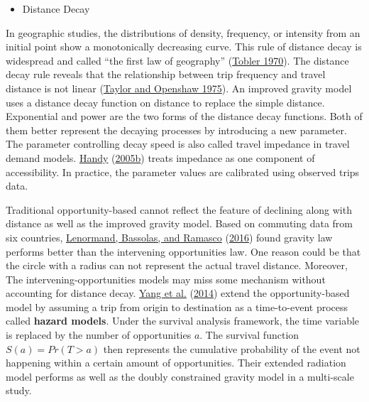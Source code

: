 \documentclass[
  12pt,
]{article}
\providecommand{\tightlist}{%
  \setlength{\itemsep}{0pt}\setlength{\parskip}{0pt}}
\begin{document}
\begin{itemize}
\tightlist
\item
  Distance Decay
\end{itemize}

In geographic studies, the distributions of density, frequency, or intensity from an initial point show a monotonically decreasing curve. This rule of distance decay is widespread and called ``the first law of geography'' (\protect\hyperlink{ref-toblerComputerMovieSimulating1970}{Tobler 1970}). The distance decay rule reveals that the relationship between trip frequency and travel distance is not linear (\protect\hyperlink{ref-taylorDistanceDecaySpatial1975}{Taylor and Openshaw 1975}). An improved gravity model uses a distance decay function on distance to replace the simple distance. Exponential and power are the two forms of the distance decay functions. Both of them better represent the decaying processes by introducing a new parameter. The parameter controlling decay speed is also called travel impedance in travel demand models. \protect\hyperlink{ref-handyPlanningAccessibilityTheory2005}{Handy} (\protect\hyperlink{ref-handyPlanningAccessibilityTheory2005}{2005b}) treats impedance as one component of accessibility. In practice, the parameter values are calibrated using observed trips data.

Traditional opportunity-based cannot reflect the feature of declining along with distance as well as the improved gravity model. Based on commuting data from six countries, \protect\hyperlink{ref-lenormandSystematicComparisonTrip2016}{Lenormand, Bassolas, and Ramasco} (\protect\hyperlink{ref-lenormandSystematicComparisonTrip2016}{2016}) found gravity law performs better than the intervening opportunities law. One reason could be that the circle with a radius can not represent the actual travel distance. Moreover, The intervening-opportunities models may miss some mechanism without accounting for distance decay. \protect\hyperlink{ref-yangLimitsPredictabilityCommuting2014}{Yang et al.} (\protect\hyperlink{ref-yangLimitsPredictabilityCommuting2014}{2014}) extend the opportunity-based model by assuming a trip from origin to destination as a time-to-event process called \textbf{hazard models}. Under the survival analysis framework, the time variable is replaced by the number of opportunities \(a\). The survival function \(S(a)=Pr(T>a)\) then represents the cumulative probability of the event not happening within a certain amount of opportunities. Their extended radiation model performs as well as the doubly constrained gravity model in a multi-scale study.
\end{document}
